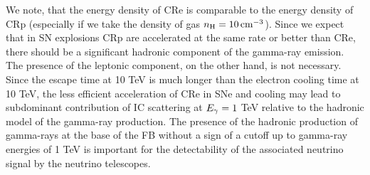 We note, that the energy density of CRe is comparable to the energy density of CRp 
(especially if we take the density of gas $n_{\text{H}} = \SI{10}{cm^{-3}}$).
Since we expect that in SN explosions CRp are accelerated at the same rate or better than CRe,
there should be a significant hadronic component of the gamma-ray emission.
The presence of the leptonic component, on the other hand, is not necessary.
Since the escape time at 10 TeV is much longer than the electron cooling time at 10 TeV,
the less efficient acceleration of CRe in SNe and cooling may lead to subdominant contribution of 
IC scattering at $E_\gamma = 1$ TeV relative to the hadronic model of the gamma-ray production.
The presence of the hadronic production of gamma-rays at the base of the FB without a sign of a cutoff up to gamma-ray energies
of 1 TeV is important for the detectability of the associated neutrino signal by the neutrino telescopes.

